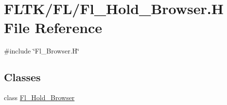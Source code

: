 \hypertarget{_fl___hold___browser_8_h}{}\section{F\+L\+T\+K/\+F\+L/\+Fl\+\_\+\+Hold\+\_\+\+Browser.H File Reference}
\label{_fl___hold___browser_8_h}
{\ttfamily \#include \char`\"{}Fl\+\_\+\+Browser.\+H\char`\"{}}\newline
\subsection*{Classes}
\begin{DoxyCompactItemize}
\item 
class \hyperlink{class_fl___hold___browser}{Fl\+\_\+\+Hold\+\_\+\+Browser}
\end{DoxyCompactItemize}
